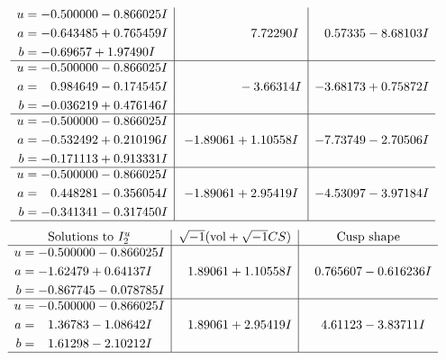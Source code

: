 \documentclass[1p]{elsarticle_modified}
\theoremstyle{definition}
\newcommand{\I}{\sqrt{-1}}
\begin{document}
$$\begin{array}{c|c|c}
\begin{aligned}
u &= -0.500000 - 0.866025 I \\
a &= -0.643485 + 0.765459 I \\
b &= -0.69657 + 1.97490 I\end{aligned}
 & \phantom{-0.000000 -}7.72290 I & \phantom{-}0.57335 - 8.68103 I \\ \hline\begin{aligned}
u &= -0.500000 - 0.866025 I \\
a &= \phantom{-}0.984649 - 0.174545 I \\
b &= -0.036219 + 0.476146 I\end{aligned}
 & \phantom{-0.000000 } -3.66314 I & -3.68173 + 0.75872 I \\ \hline\begin{aligned}
u &= -0.500000 - 0.866025 I \\
a &= -0.532492 + 0.210196 I \\
b &= -0.171113 + 0.913331 I\end{aligned}
 & -1.89061 + 1.10558 I & -7.73749 - 2.70506 I \\ \hline\begin{aligned}
u &= -0.500000 - 0.866025 I \\
a &= \phantom{-}0.448281 - 0.356054 I \\
b &= -0.341341 - 0.317450 I\end{aligned}
 & -1.89061 + 2.95419 I & -4.53097 - 3.97184 I\\
 \hline 
 \end{array}$$\newpage$$\begin{array}{c|c|c}  
\text{Solutions to }I^u_{2}& \I (\text{vol} + \sqrt{-1}CS) & \text{Cusp shape}\\
 \hline 
\begin{aligned}
u &= -0.500000 - 0.866025 I \\
a &= -1.62479 + 0.64137 I \\
b &= -0.867745 - 0.078785 I\end{aligned}
 & \phantom{-}1.89061 + 1.10558 I & \phantom{-}0.765607 - 0.616236 I \\ \hline\begin{aligned}
u &= -0.500000 - 0.866025 I \\
a &= \phantom{-}1.36783 - 1.08642 I \\
b &= \phantom{-}1.61298 - 2.10212 I\end{aligned}
 & \phantom{-}1.89061 + 2.95419 I & \phantom{-}4.61123 - 3.83711 I\\
 \hline 
 \end{array}$$\newpage\newpage\renewcommand{\arraystretch}{1}
\end{document}
